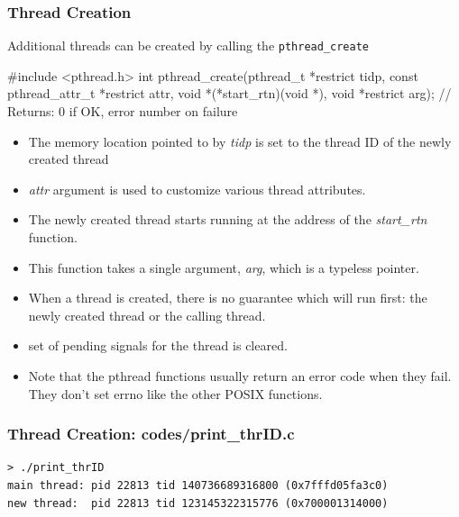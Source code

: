 \documentclass[newPxFont,sthlmFooter,nooffset]{beamer}
\begin{document}
\begin{frame}[fragile,t]
  \frametitle{Thread Creation}
  Additional threads can be created by calling the \texttt{pthread\_create}

  \begin{codedef}
#include <pthread.h>
int pthread_create(pthread_t *restrict tidp, 
                   const pthread_attr_t *restrict attr,
                   void *(*start_rtn)(void *), 
                   void *restrict arg); 
// Returns: 0 if OK, error number on failure    
  \end{codedef}

{\footnotesize
  \begin{itemize}
  \item The memory location pointed to by \textit{tidp} is set to the
    thread ID of the newly created thread
  \item \textit{attr} argument is used to customize various thread
    attributes.
  \item The newly created thread starts running at the address of the
    \textit{start\_rtn} function.
  \item This function takes a single argument, \textit{arg}, which is
    a typeless pointer.
  \item When a thread is created, there is no guarantee which will run
    first: the newly created thread or the calling thread.
  \item set of pending signals for the thread is cleared.
  \item Note that the pthread functions usually return an error code
    when they fail. They don’t set errno like the other POSIX
    functions.
  \end{itemize}
}
\end{frame}

\begin{frame}
  \frametitle{Thread Creation: codes/print\_thrID.c}

  

\begin{verbatim}
> ./print_thrID
main thread: pid 22813 tid 140736689316800 (0x7fffd05fa3c0)
new thread:  pid 22813 tid 123145322315776 (0x700001314000)
\end{verbatim}

\end{frame}
\end{document}
